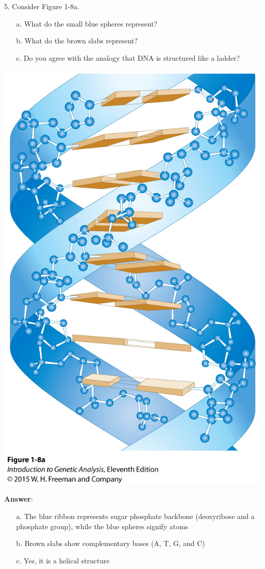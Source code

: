 \documentclass[11pt,]{article}
\begin{document}
\begin{blackbox}
5. Consider Figure 1-8a. \begin{enumerate} 
 \item[a.]{ What do the small blue spheres represent? } 
 \item[b.]{ What do the brown slabs represent? } 
 \item[c.]{ Do you agree with the analogy that DNA is structured like a ladder? } 
 \end{enumerate}



\begin{center}\includegraphics[width=0.25\linewidth,]{input/figure_01_08a} \end{center}

\textbf{Answer}:
\begin{enumerate} 
 \item[a.]{ The blue ribbon represents sugar phosphate backbone (deoxyribose and a phosphate group), while the blue spheres signify atoms } 
 \item[b.]{ Brown slabs show complementary bases (A, T, G, and C) } 
 \item[c.]{ Yes, it is a helical structure } 
 \end{enumerate}
\end{blackbox}
\end{document}
